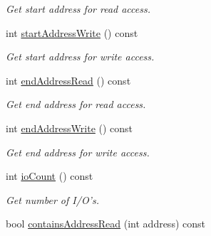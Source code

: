 \begin{DoxyCompactItemize}
\begin{DoxyCompactList}\small\item\em Get start address for read access. \end{DoxyCompactList}\item 
\hypertarget{classmdt_device_ios_segment_a5e0d32079a575623d1ae75f81a172169}{
int \hyperlink{classmdt_device_ios_segment_a5e0d32079a575623d1ae75f81a172169}{startAddressWrite} () const }
\label{classmdt_device_ios_segment_a5e0d32079a575623d1ae75f81a172169}

\begin{DoxyCompactList}\small\item\em Get start address for write access. \end{DoxyCompactList}\item 
\hypertarget{classmdt_device_ios_segment_aa3a37811ccdefd9750e395f31f1bb472}{
int \hyperlink{classmdt_device_ios_segment_aa3a37811ccdefd9750e395f31f1bb472}{endAddressRead} () const }
\label{classmdt_device_ios_segment_aa3a37811ccdefd9750e395f31f1bb472}

\begin{DoxyCompactList}\small\item\em Get end address for read access. \end{DoxyCompactList}\item 
\hypertarget{classmdt_device_ios_segment_a92bb27b37027668c25e50958397961f6}{
int \hyperlink{classmdt_device_ios_segment_a92bb27b37027668c25e50958397961f6}{endAddressWrite} () const }
\label{classmdt_device_ios_segment_a92bb27b37027668c25e50958397961f6}

\begin{DoxyCompactList}\small\item\em Get end address for write access. \end{DoxyCompactList}\item 
\hypertarget{classmdt_device_ios_segment_aa5d6905c7200a8fb74a6c86708be434e}{
int \hyperlink{classmdt_device_ios_segment_aa5d6905c7200a8fb74a6c86708be434e}{ioCount} () const }
\label{classmdt_device_ios_segment_aa5d6905c7200a8fb74a6c86708be434e}

\begin{DoxyCompactList}\small\item\em Get number of I/O's. \end{DoxyCompactList}\item 
\hypertarget{classmdt_device_ios_segment_a895870593b581138ed7e43e6773741ed}{
bool \hyperlink{classmdt_device_ios_segment_a895870593b581138ed7e43e6773741ed}{containsAddressRead} (int address) const }
\label{classmdt_device_ios_segment_a895870593b581138ed7e43e6773741ed}


\end{DoxyCompactItemize}
